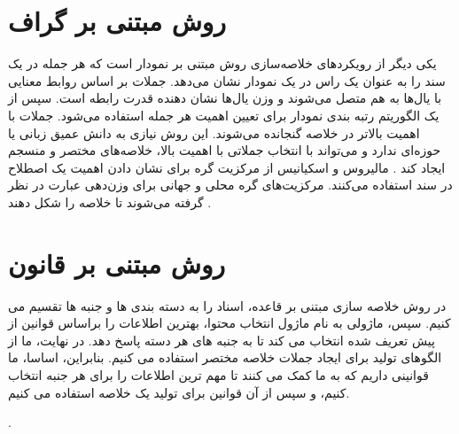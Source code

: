 \section{روش مبتنی بر گراف}
یکی دیگر از رویکردهای خلاصه‌سازی روش مبتنی بر نمودار است که هر جمله در یک سند را به عنوان یک راس در یک نمودار نشان می‌دهد. جملات بر اساس روابط معنایی با یال‌ها به هم متصل می‌شوند و وزن یال‌ها نشان دهنده قدرت رابطه است. سپس از یک الگوریتم رتبه بندی نمودار برای تعیین اهمیت هر جمله استفاده می‌شود. جملات با اهمیت بالاتر در خلاصه گنجانده می‌شوند. این روش نیازی به دانش عمیق زبانی یا حوزه‌ای ندارد و می‌تواند با انتخاب جملاتی با اهمیت بالا، خلاصه‌های مختصر و منسجم ‌ایجاد کند
\cite{andhale2016overview}.
مالیروس و اسکیانیس  از مرکزیت گره برای نشان دادن اهمیت یک اصطلاح در سند استفاده می‌کنند. مرکزیت‌های گره محلی و جهانی برای وزن‌دهی عبارت در نظر گرفته می‌شوند تا خلاصه را شکل دهند
\cite{GraphBased}.
\section{روش مبتنی بر قانون }
در روش خلاصه سازی مبتنی بر قاعده، اسناد را به دسته بندی ها و جنبه ها تقسیم می کنیم. سپس، ماژولی به نام ماژول انتخاب محتوا، بهترین اطلاعات را براساس قوانین از پیش تعریف شده انتخاب می کند تا به جنبه های هر دسته پاسخ دهد. در نهایت، ما از الگوهای تولید برای ایجاد جملات خلاصه مختصر استفاده می کنیم. بنابراین، اساسا، ما قوانینی داریم که به ما کمک می کنند تا مهم ترین اطلاعات را برای هر جنبه انتخاب کنیم، و سپس از آن قوانین برای تولید یک خلاصه استفاده می کنیم.

\cite{Moratanchsurvey}.






